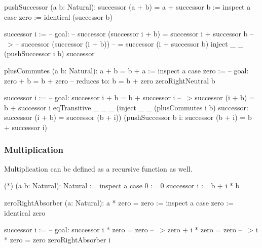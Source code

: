 \begin{alba}
    pushSuccessor (a b: Natural): successor (a + b) = a + successor b :=
        inspect a case
            zero :=
                identical (successor b)

            successor i :=
                -- goal:
                --   successor (successor i + b) = successor i + successor b
                -- ~>
                --   successor (successor (i + b))
                --   = successor (i + successor b)
                inject _ _
                    (pushSuccessor i b)
                    successor
\end{alba}



\begin{alba}
    plusCommutes (a b: Natural): a + b = b + a :=
        inspect a case
            zero :=
                -- goal: zero + b = b + zero
                -- reduces to: b = b + zero
                zeroRightNeutral b

            successor i :=
                -- goal: successor i + b = b + successor i
                -- ~>    successor (i + b) = b + successor i
                eqTransitive
                    _ _ _
                    (inject _ _ (plusCommutes i b) successor:
                        successor (i + b) = successor (b + i))
                    (pushSuccessor b i:
                        successor (b + i) =  b + successor i)
\end{alba}







\subsubsection{Multiplication}



Multiplication can be defined as a recursive function as well.

\begin{alba}
  (*) (a b: Natural): Natural :=
    inspect a case
        0 :=
            0
        successor i :=
            b + i * b
\end{alba}

\begin{alba}
    zeroRightAbsorber (a: Natural): a * zero = zero :=
        inspect a case
            zero :=
                identical zero

            successor i :=
                -- goal: successor i * zero = zero
                -- ~>    zero + i * zero = zero
                -- ~>    i * zero = zero
                zeroRightAbsorber i
\end{alba}

